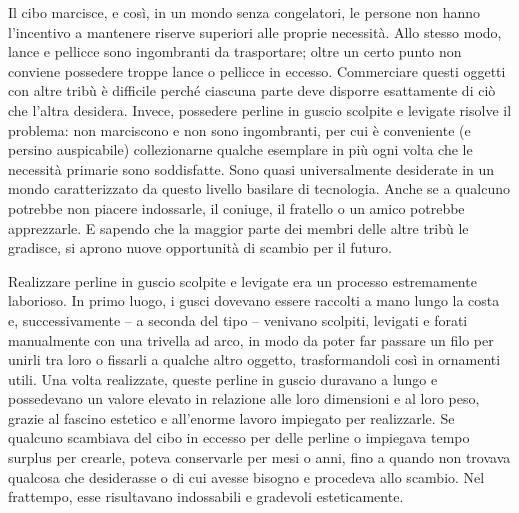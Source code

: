 \documentclass[
  a5paper,
  smalldemyvopaper,10pt,twoside,onecolumn,openright,extrafontsizes,hidelinks]{memoir}
\begin{document}
Il cibo marcisce, e così, in un mondo senza congelatori, le persone non
hanno l'incentivo a mantenere riserve superiori alle proprie necessità.
Allo stesso modo, lance e pellicce sono ingombranti da trasportare;
oltre un certo punto non conviene possedere troppe lance o pellicce in
eccesso. Commerciare questi oggetti con altre tribù è difficile perché
ciascuna parte deve disporre esattamente di ciò che l'altra desidera.
Invece, possedere perline in guscio scolpite e levigate risolve il
problema: non marciscono e non sono ingombranti, per cui è conveniente
(e persino auspicabile) collezionarne qualche esemplare in più ogni
volta che le necessità primarie sono soddisfatte. Sono quasi
universalmente desiderate in un mondo caratterizzato da questo livello
basilare di tecnologia. Anche se a qualcuno potrebbe non piacere
indossarle, il coniuge, il fratello o un amico potrebbe apprezzarle. E
sapendo che la maggior parte dei membri delle altre tribù le gradisce,
si aprono nuove opportunità di scambio per il futuro.

Realizzare perline in guscio scolpite e levigate era un processo
estremamente laborioso. In primo luogo, i gusci dovevano essere raccolti
a mano lungo la costa e, successivamente -- a seconda del tipo --
venivano scolpiti, levigati e forati manualmente con una trivella ad
arco, in modo da poter far passare un filo per unirli tra loro o
fissarli a qualche altro oggetto, trasformandoli così in ornamenti
utili. Una volta realizzate, queste perline in guscio duravano a lungo e
possedevano un valore elevato in relazione alle loro dimensioni e al
loro peso, grazie al fascino estetico e all'enorme lavoro impiegato per
realizzarle. Se qualcuno scambiava del cibo in eccesso per delle perline
o impiegava tempo surplus per crearle, poteva conservarle per mesi o
anni, fino a quando non trovava qualcosa che desiderasse o di cui avesse
bisogno e procedeva allo scambio. Nel frattempo, esse risultavano
indossabili e gradevoli esteticamente.
\end{document}
